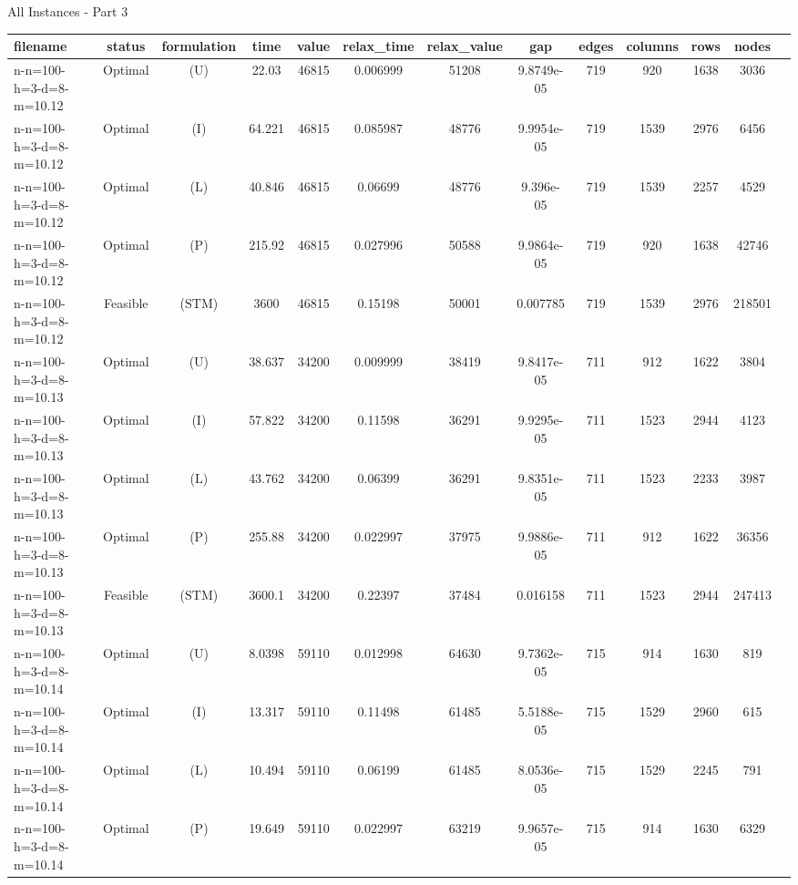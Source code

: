 \documentclass[landscape, a4paper]{article}
\newcommand{\STM}{\ensuremath{\mathrm{STM}}}
\newcommand{\Improved}{\ensuremath{\mathrm{I}}}
\newcommand{\Loose}{\ensuremath{\mathrm{L}}}
\newcommand{\Profit}{\ensuremath{\mathrm{P}}}
\newcommand{\Utility}{\ensuremath{\mathrm{U}}}
\begin{document}
\begin{center}
\newpage
All Instances - Part 3

\begin{tabular}{lcccccccccccc}
filename & status & formulation & time & value & relax\_time & relax\_value & gap & edges & columns & rows & nodes & \\
\hline
n-n=100-h=3-d=8-m=10.12 & Optimal & (\Utility) & 22.03 & 46815 & 0.006999 & 51208 & 9.8749e-05 & 719 & 920 & 1638 & 3036 & \\
n-n=100-h=3-d=8-m=10.12 & Optimal & (\Improved) & 64.221 & 46815 & 0.085987 & 48776 & 9.9954e-05 & 719 & 1539 & 2976 & 6456 & \\
n-n=100-h=3-d=8-m=10.12 & Optimal & (\Loose) & 40.846 & 46815 & 0.06699 & 48776 & 9.396e-05 & 719 & 1539 & 2257 & 4529 & \\
n-n=100-h=3-d=8-m=10.12 & Optimal & (\Profit) & 215.92 & 46815 & 0.027996 & 50588 & 9.9864e-05 & 719 & 920 & 1638 & 42746 & \\
n-n=100-h=3-d=8-m=10.12 & Feasible & (\STM) & 3600 & 46815 & 0.15198 & 50001 & 0.007785 & 719 & 1539 & 2976 & 218501 & \\
n-n=100-h=3-d=8-m=10.13 & Optimal & (\Utility) & 38.637 & 34200 & 0.009999 & 38419 & 9.8417e-05 & 711 & 912 & 1622 & 3804 & \\
n-n=100-h=3-d=8-m=10.13 & Optimal & (\Improved) & 57.822 & 34200 & 0.11598 & 36291 & 9.9295e-05 & 711 & 1523 & 2944 & 4123 & \\
n-n=100-h=3-d=8-m=10.13 & Optimal & (\Loose) & 43.762 & 34200 & 0.06399 & 36291 & 9.8351e-05 & 711 & 1523 & 2233 & 3987 & \\
n-n=100-h=3-d=8-m=10.13 & Optimal & (\Profit) & 255.88 & 34200 & 0.022997 & 37975 & 9.9886e-05 & 711 & 912 & 1622 & 36356 & \\
n-n=100-h=3-d=8-m=10.13 & Feasible & (\STM) & 3600.1 & 34200 & 0.22397 & 37484 & 0.016158 & 711 & 1523 & 2944 & 247413 & \\
n-n=100-h=3-d=8-m=10.14 & Optimal & (\Utility) & 8.0398 & 59110 & 0.012998 & 64630 & 9.7362e-05 & 715 & 914 & 1630 & 819 & \\
n-n=100-h=3-d=8-m=10.14 & Optimal & (\Improved) & 13.317 & 59110 & 0.11498 & 61485 & 5.5188e-05 & 715 & 1529 & 2960 & 615 & \\
n-n=100-h=3-d=8-m=10.14 & Optimal & (\Loose) & 10.494 & 59110 & 0.06199 & 61485 & 8.0536e-05 & 715 & 1529 & 2245 & 791 & \\
n-n=100-h=3-d=8-m=10.14 & Optimal & (\Profit) & 19.649 & 59110 & 0.022997 & 63219 & 9.9657e-05 & 715 & 914 & 1630 & 6329 & \\

\end{tabular}
\end{center}
\end{document}
